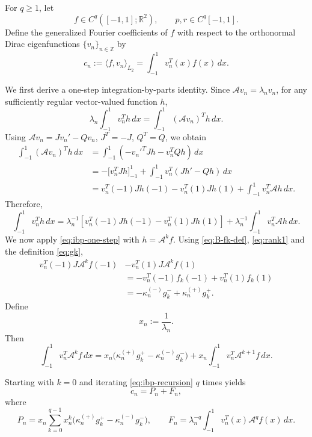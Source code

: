 \documentclass[11pt,a4paper]{article}
\theoremstyle{definition}
\begin{document}
For $q\geq1$, let
\[
f\in C^q([-1,1];\mathbb R^2),
\qquad
p,r\in C^q[-1,1].
\]
Define the generalized Fourier coefficients of $f$ with respect to the
orthonormal Dirac eigenfunctions $\{v_n\}_{n\in\mathbb Z}$ by
\[
c_n
:=
\langle f,v_n\rangle_{L_2}
=
\int_{-1}^{1}v_n^T(x)f(x)\,dx.
\]

We first derive a one-step integration-by-parts identity. Since
$\mathcal Av_n=\lambda_n v_n$, for any sufficiently regular
vector-valued function $h$,
\[
\lambda_n\int_{-1}^{1}v_n^T h\,dx
=
\int_{-1}^{1}(\mathcal Av_n)^T h\,dx.
\]
Using \(\mathcal Av_n=Jv_n'-Qv_n\), \(J^T=-J\), \(Q^T=Q\),
we obtain
\[
\begin{aligned}
\int_{-1}^{1}(\mathcal Av_n)^T h\,dx
&=
\int_{-1}^{1}
\left(-v_n'^T Jh-v_n^TQh\right)\,dx
\\
&=
-\bigl[v_n^T Jh\bigr]_{-1}^{1}
+
\int_{-1}^{1}v_n^T(Jh'-Qh)\,dx
\\
&=
v_n^T(-1)Jh(-1)
-
v_n^T(1)Jh(1)
+
\int_{-1}^{1}v_n^T\mathcal Ah\,dx.
\end{aligned}
\]
Therefore,
\begin{equation}\label{eq:ibp-one-step}
\int_{-1}^{1}v_n^T h\,dx
=
\lambda_n^{-1}
\left[
v_n^T(-1)Jh(-1)
-
v_n^T(1)Jh(1)
\right]
+
\lambda_n^{-1}
\int_{-1}^{1}v_n^T\mathcal Ah\,dx.
\end{equation}
We now apply \eqref{eq:ibp-one-step} with $h=\mathcal A^k f$.
Using \eqref{eq:B-fk-def}, \eqref{eq:rank1} and the definition \eqref{eq:gk},
\[
\begin{aligned}
v_n^T(-1)J\mathcal A^k f(-1)
&-
v_n^T(1)J\mathcal A^k f(1)
\\
&
=
-v_n^T(-1)f_k(-1)
+
v_n^T(1)f_k(1)
\\
&
=
-\kappa_n^{(-)}g_k^-
+
\kappa_n^{(+)}g_k^+.
\end{aligned}
\]
Define
\[
x_n:=\frac{1}{\lambda_n}.
\]
Then
\begin{equation}\label{eq:ibp-recursion}
\int_{-1}^{1}v_n^T\mathcal A^k f\,dx
=
x_n\bigl(\kappa_n^{(+)}g_k^+-\kappa_n^{(-)}g_k^-\bigr)
+
x_n\int_{-1}^{1}v_n^T\mathcal A^{k+1}f\,dx.
\end{equation}

Starting with $k=0$ and iterating
\eqref{eq:ibp-recursion} $q$ times yields
\begin{equation}\label{eq:cn-decomp}
c_n=P_n+F_n,
\end{equation}
where
\begin{equation}\label{eq:PnFn}
P_n
=
x_n\sum_{k=0}^{q-1}
x_n^k\bigl(\kappa_n^{(+)}g_k^+-\kappa_n^{(-)}g_k^-\bigr),
\qquad
F_n
=
\lambda_n^{-q}
\int_{-1}^{1}
v_n^T(x)\mathcal A^q f(x)\,dx.
\end{equation}
\end{document}
